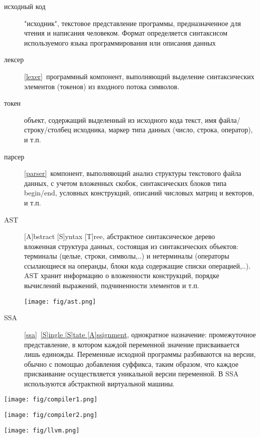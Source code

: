 \label{compiler}\secdown


\begin{description}
\item[исходный код] "исходник", текстовое представление программы,
предназначенное для чтения и написания человеком. Формат определяется
синтаксисом используемого языка программирования или описания данных 
\item[лексер] \ref{lexer}\ программный компонент, выполняющий выделение 
синтаксических элементов (токенов) из входного потока символов.
\item[токен] объект, содержащий выделенный из исходного кода текст,
имя файла/строку/столбец исходника, маркер типа данных (число, строка, оператор),
и т.п.
\item[парсер] \ref{parser}\ компонент, выполняющий анализ структуры текстового файла данных,
с учетом вложенных скобок, синтаксических блоков типа begin/end, условных конструкций,
описаний числовых матриц и векторов, и т.п.
\item[AST] [A]bstract [S]yntax [T]ree, абстрактное синтаксическое дерево\\
вложенная структура данных, состоящая из синтаксических объектов: 
терминалы (целые, строки, символы,..) и нетерминалы (операторы ссылающиеся на операнды,
блоки кода содержащие списки операцией,..). AST хранит информацию о вложенности конструкций,
порядке вычислений выражений, подчиненности элементов и т.п.

\noindent\texttt{[image: fig/ast.png]}

\item[SSA] \ref{ssa}\ \href{https://ru.wikipedia.org/wiki/SSA}{[S]ingle [S]tate
[A]ssignment}, 
однократное назначение: промежуточное представление, в котором каждой переменной 
значение присваивается лишь единожды. Переменные исходной программы разбиваются 
на версии, обычно с помощью добавления суффикса, таким образом, что каждое 
присваивание осуществляется уникальной версии переменной.
В SSA используются  
абстрактной виртуальной машины. 

  
\end{description}


\texttt{[image: fig/compiler1.png]}

\pagebreak
\texttt{[image: fig/compiler2.png]}

\noindent\texttt{[image: fig/llvm.png]}

\secup
